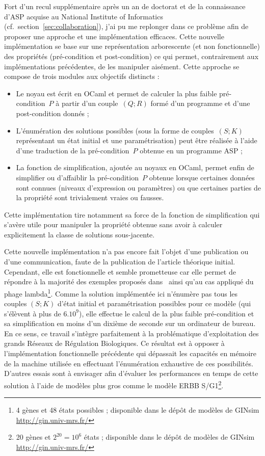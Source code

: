 Fort d'un recul supplémentaire après un an de doctorat et de la connaissance d'ASP acquise au National Institute of Informatics (cf.~section~\ref{sec:collaboration}), j'ai pu me replonger dans ce problème afin de proposer une approche et une implémentation efficaces.
Cette nouvelle implémentation se base sur une représentation arborescente (et non fonctionnelle) des propriétés (pré-condition et post-condition) ce qui permet, contrairement aux implémentations précédentes, de les manipuler aisément.
Cette approche se compose de trois modules aux objectifs distincts :
\begin{itemize}
  \item Le noyau est écrit en OCaml et permet de calculer la plus faible pré-condition~$P$ à partir d'un couple~$(Q ; R)$ formé d'un programme et d'une post-condition donnés ;
  \item L'énumération des solutions possibles (sous la forme de couples~$(S ; K)$ représentant un état initial et une paramétrisation) peut être réalisée à l'aide d'une traduction de la pré-condition~$P$ obtenue en un programme ASP ;
  \item La fonction de simplification, ajoutée au noyaux en OCaml, permet enfin de simplifier ou d'affaiblir la pré-condition~$P$ obtenue lorsque certaines données sont connues (niveaux d'expression ou paramètres) ou que certaines parties de la propriété sont trivialement vraies ou fausses.
\end{itemize}
Cette implémentation tire notamment sa force de la fonction de simplification qui s'avère utile pour manipuler la propriété obtenue sans avoir à calculer explicitement la classe de solutions sous-jacente.

Cette nouvelle implémentation n'a pas encore fait l'objet d'une publication ou d'une communication, faute de la publication de l'article théorique initial.
Cependant, elle est fonctionnelle et semble prometteuse car elle permet de répondre à la majorité des exemples proposés dans~\cite{khalis-bernot-comet-richard-roux-siebert-UnPublished} ainsi qu'au cas appliqué du phage lambda\footnote{4 gènes et 48 états possibles ; disponible dans le dépôt de modèles de GINsim \url{http://gin.univ-mrs.fr/}}.
Comme la solution implémentée ici n'énumère pas tous les couples $(S ; K)$ d'état initial et paramétrisation possibles pour ce modèle (qui s'élèvent à plus de $6.10^9$), elle effectue le calcul de la plus faible pré-condition et sa simplification en moins d'un dixième de seconde sur un ordinateur de bureau.
En ce sens, ce travail s'intègre parfaitement à la problématique d'exploitation des grands Réseaux de Régulation Biologiques.
Ce résultat est à opposer à l'implémentation fonctionnelle précédente qui dépassait les capacités en mémoire de la machine utilisée en effectuant l'énumération exhaustive de ces possibilités.
D'autres essais sont à envisager afin d'évaluer les performances en temps de cette solution à l'aide de modèles plus gros comme le modèle ERBB S/G1\footnote{20 gènes et $2^{20} = 10^6$ états ; disponible dans le dépôt de modèles de GINsim \url{http://gin.univ-mrs.fr/}}.



